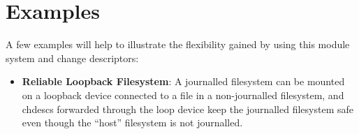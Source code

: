 \section{Examples}
\label{sec:examples}

A few examples will help to illustrate the flexibility gained by using this
module system and change descriptors:

\begin{itemize}

\item \itemvspace{} {\bf Reliable Loopback Filesystem}: A journalled filesystem
  can be mounted on a loopback device connected to a file in a non-journalled
  filesystem, and chdescs forwarded through the loop device keep the journalled
  filesystem safe even though the ``host'' filesystem is not journalled.

\end{itemize}
\postlistspacing{}
